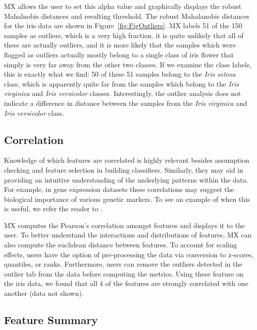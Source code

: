 \documentclass[12pt]{article}
\begin{document}
MX allows the user to set this alpha value and graphically displays the robust Mahalnobis distances and resulting threshold. The robust Mahalanobis distances for the iris data are shown in Figure~\ref{fig:FigOutliers}. MX labels 51 of the 150 samples as outliers, which is a very high fraction. it is quite unlikely that all of these are actually outliers, and it is more likely that the samples which were flagged as outliers actually mostly belong to a single class of iris flower that simply is very far away from the other two classes. If we examine the class labels, this is exactly what we find: 50 of these 51 samples belong to the \textit{Iris setosa} class, which is apparently quite far from the samples which belong to the \textit{Iris virginica} and \textit{Iris versicolor} classes. Interestingly, the outlier analysis does not indicate a difference in distance between the samples from the \textit{Iris virginica} and \textit{Iris versicolor} class. 

\subsection{Correlation}
\label{subsec:SubSecCorrelation}

Knowledge of which features are correlated is highly relevant besides assumption checking and feature selection in building classifiers. Similarly, they may aid in providing an intuitive understanding of the underlying patterns within the data. For example, in gene expression datasets these correlations may suggest the biological importance of various genetic markers. To see an example of when this is useful, we refer the reader to \cite{shi2012unsupervised}.

MX computes the Pearson's correlation amongst features and displays it to the user. To better understand the interactions and distributions of features, MX can also compute the euclidean distance between features. To account for scaling effects, users have the option of pre-processing the data via conversion to z-scores, quantiles, or ranks. Furthermore, users can remove the outliers detected in the outlier tab from the data before computing the metrics. Using these feature on the iris data, we found that all 4 of the features are strongly correlated with one another (data not shown).

\subsection{Feature Summary}
\label{subsec:SubSecFeature}
\end{document}
